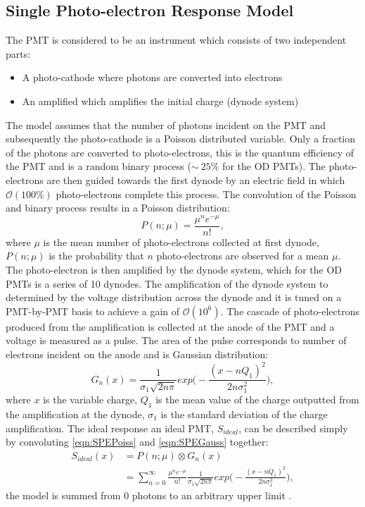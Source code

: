 \subsection{Single Photo-electron Response Model}
The PMT is considered to be an instrument which consists of two independent parts:
\begin{itemize}
    \item A photo-cathode where photons are converted into electrons
    \item An amplified which amplifies the initial charge (dynode system)
\end{itemize}
The model assumes that the number of photons incident on the PMT and subsequently the photo-cathode is a Poisson distributed variable. Only a fraction of the photons are converted to photo-electrons, this is the quantum efficiency of the PMT and is a random binary process ($\sim~25\%$ for the OD PMTs). The photo-electrons are then guided towards the first dynode by an electric field in which $\mathcal{O}(100\%)$ photo-electrons complete this process. The convolution of the Poisson and binary process results in a Poisson distribution:
\begin{equation}\label{eqn:SPEPoiss}
    P(n;\mu)=\frac{\mu^{n}e^{-\mu}}{n!},
\end{equation}
where $\mu$ is the mean number of photo-electrons collected at first dynode, $P(n;\mu)$ is the probability that $n$ photo-electrons are observed for a mean $\mu$.
The photo-electron is then amplified by the dynode system, which for the OD PMTs is a series of 10 dynodes. The amplification of the dynode system to determined by the voltage distribution across the dynode and it is tuned on a PMT-by-PMT basis to achieve a gain of $\mathcal{O}(10^6)$. The cascade of photo-electrons produced from the amplification is collected at the anode of the PMT and a voltage is measured as a pulse. The area of the pulse corresponds to number of electrons incident on the anode and is Gaussian distribution:
\begin{equation}\label{eqn:SPEGauss}
    G_n(x)=\frac{1}{\sigma_1\sqrt{2n\pi}}exp\biggl(-\frac{(x-nQ_1)^2}{2n\sigma_1^2}\biggl),
\end{equation}
where $x$ is the variable charge, $Q_1$ is the mean value of the charge outputted from the amplification at the dynode, $\sigma_1$ is the standard deviation of the charge amplification.
The ideal response an ideal PMT, $S_{ideal}$, can be described simply by convoluting \autoref{eqn:SPEPoiss} and \autoref{eqn:SPEGauss} together:
\begin{equation}
    \begin{split}
    S_{ideal}(x) & = P(n;\mu)\otimes G_n(x) \\
    & = \sum^\infty_{n=0}\frac{\mu^{n}e^{-\mu}}{n!}\frac{1}{\sigma_1\sqrt{2n\pi}}exp\biggl(-\frac{(x-nQ_1)^2}{2n\sigma_1^2}\biggl),
    \end{split}
\end{equation}
the model is summed from 0 photons to an arbitrary upper limit \cite{BELLAMY1994468}.
